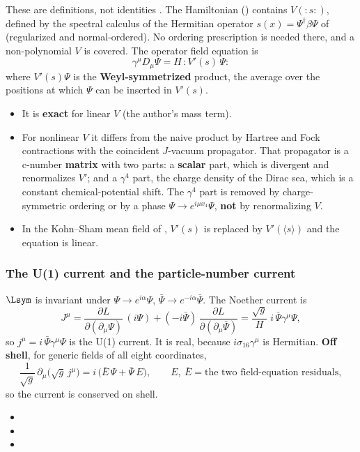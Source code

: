 These are definitions, not identities . The Hamiltonian ()
contains $V(:\!s\!:)$, defined by the spectral calculus of the Hermitian operator
$s(x)=\Psi^{\dagger}\beta\Psi$ of  (regularized and normal-ordered). No ordering
prescription is needed there, and a non-polynomial $V$ is covered. The operator field equation is
\[
  \gamma^\mu D_\mu\Psi=H\,{:}V'(s)\,\Psi{:}
\]
where $V'(s)\Psi$ is the \textbf{Weyl-symmetrized} product, the average over the positions at which
$\Psi$ can be inserted in $V'(s)$.
\begin{itemize}
  \item It is \textbf{exact} for linear $V$ (the author's mass term).
  \item For nonlinear $V$ it differs from the naive product by Hartree and Fock contractions with the
        coincident $J$-vacuum propagator. That propagator is a c-number \textbf{matrix} with two
        parts: a \textbf{scalar} part, which is divergent and renormalizes $V'$; and a
        $\gamma^4$ part, the charge density of the Dirac sea, which is a constant
        chemical-potential shift. The $\gamma^4$ part is removed by charge-symmetric ordering or by
        a phase $\Psi\to e^{i\mu x_4}\Psi$, \textbf{not} by renormalizing $V$.
  \item In the Kohn--Sham mean field of , $V'(s)$ is replaced by $V'(\langle s\rangle)$
        and the equation is linear.
\end{itemize}

\subsubsection{The U(1) current and the particle-number current}
\label{sec:3.4.10}

$\Lsym$ is invariant under $\Psi\to e^{i\alpha}\Psi$, $\bar\Psi\to e^{-i\alpha}\bar\Psi$. The Noether
current is
\[
  J^\mu=\frac{\partial L}{\partial(\partial_\mu\Psi)}\,(i\Psi)+(-i\bar\Psi)\,\frac{\partial L}{\partial(\partial_\mu\bar\Psi)}
  =\frac{\sqrt g}{H}\;i\,\bar\Psi\gamma^\mu\Psi ,
\]
so $j^\mu=i\,\bar\Psi\gamma^\mu\Psi$ is the U(1) current. It is real, because $i\sigma_{16}\gamma^\mu$ is
Hermitian. \textbf{Off shell}, for generic fields of all eight coordinates,
\[
  \frac{1}{\sqrt g}\,\partial_\mu\bigl(\sqrt g\,j^\mu\bigr)=i\,\bigl(\bar E\,\Psi+\bar\Psi\,E\bigr),
  \qquad E,\ \bar E=\text{the two field-equation residuals},
\]
so the current is conserved on shell. 
\begin{itemize}
  \item {}
  \item {}
  \item {}
\end{itemize}

